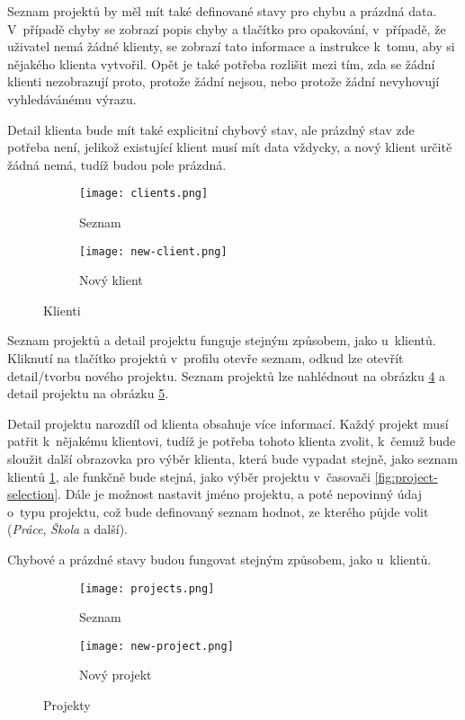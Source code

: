 Seznam projektů by měl mít také definované stavy pro chybu a prázdná data. V~případě chyby se zobrazí popis chyby a tlačítko pro opakování, v~případě, že uživatel nemá žádné klienty, se zobrazí tato informace a instrukce k~tomu, aby si nějakého klienta vytvořil. Opět je také potřeba rozlišit mezi tím, zda se žádní klienti nezobrazují proto, protože žádní nejsou, nebo protože žádní nevyhovují vyhledávánému výrazu.

Detail klienta bude mít také explicitní chybový stav, ale prázdný stav zde potřeba není, jelikož existující klient musí mít data vždycky, a nový klient určitě žádná nemá, tudíž budou pole prázdná.

\begin{figure}[h]
    \centering
    \begin{subfigure}[b]{0.4\textwidth}
		\centering
		\texttt{[image: clients.png]}
		\caption{Seznam}
		\label{fig:client-list}
	\end{subfigure}
	\hspace{2cm}
	\begin{subfigure}[b]{0.4\textwidth}
		\centering
		\texttt{[image: new-client.png]}
		\caption{Nový klient}
		\label{fig:new-client}
	\end{subfigure}
	\caption{Klienti}
	\label{fig:clients}
\end{figure}

Seznam projektů a detail projektu funguje stejným způsobem, jako u~klientů. Kliknutí na tlačítko projektů v~profilu otevře seznam, odkud lze otevřít detail/tvorbu nového projektu. Seznam projektů lze nahlédnout na obrázku \ref{fig:project-list} a detail projektu na obrázku \ref{fig:new-project}.

Detail projektu narozdíl od klienta obsahuje více informací. Každý projekt musí patřit k~nějakému klientovi, tudíž je potřeba tohoto klienta zvolit, k~čemuž bude sloužit další obrazovka pro výběr klienta, která bude vypadat stejně, jako seznam klientů \ref{fig:client-list}, ale funkčně bude stejná, jako výběr projektu v~časovači \ref{fig:project-selection}. Dále je možnost nastavit jméno projektu, a poté nepovinný údaj o~typu projektu, což bude definovaný seznam hodnot, ze kterého půjde volit (\emph{Práce}, \emph{Škola} a další).

Chybové a prázdné stavy budou fungovat stejným způsobem, jako u~klientů.

\begin{figure}[h]
    \centering
    \begin{subfigure}[b]{0.4\textwidth}
		\centering
		\texttt{[image: projects.png]}
		\caption{Seznam}
		\label{fig:project-list}
	\end{subfigure}
	\hspace{2cm}
	\begin{subfigure}[b]{0.4\textwidth}
		\centering
		\texttt{[image: new-project.png]}
		\caption{Nový projekt}
		\label{fig:new-project}
	\end{subfigure}
	\caption{Projekty}
	\label{fig:projects}
\end{figure}

